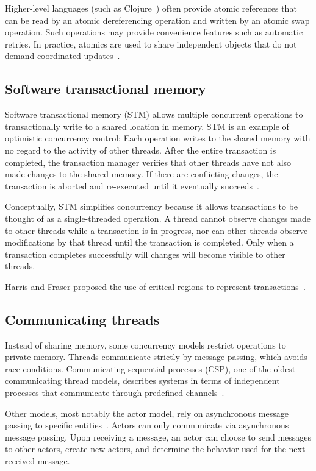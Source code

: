 \documentclass{sig-alternate}
\begin{document}
Higher-level languages (such as Clojure~\cite{Swalens2014}) often provide atomic references that can be read by an atomic dereferencing operation and written by an atomic swap operation. Such operations may provide convenience features such as automatic retries. In practice, atomics are used to share independent objects that do not demand coordinated updates~\cite{Swalens2014}.

\subsection{Software transactional memory}

Software transactional memory (STM) allows multiple concurrent operations to transactionally write to a shared location in memory. STM is an example of optimistic concurrency control: Each operation writes to the shared memory with no regard to the activity of other threads. After the entire transaction is completed, the transaction manager verifies that other threads have not also made changes to the shared memory. If there are conflicting changes, the transaction is aborted and re-executed until it eventually succeeds~\cite{Shavit1995}.

Conceptually, STM simplifies concurrency because it allows transactions to be thought of as a single-threaded operation. A thread cannot observe changes made to other threads while a transaction is in progress, nor can other threads observe modifications by that thread until the transaction is completed. Only when a transaction completes successfully will changes will become visible to other threads.

Harris and Fraser proposed the use of critical regions to represent transactions~\cite{Harris2014}.

\subsection{Communicating threads}

Instead of sharing memory, some concurrency models restrict operations to private memory. Threads communicate strictly by message passing, which avoids race conditions. Communicating sequential processes (CSP), one of the oldest communicating thread models, describes systems in terms of independent processes that communicate through predefined channels~\cite{Hoare1978}.

Other models, most notably the actor model, rely on asynchronous message passing to specific entities~\cite{Agha1986}. Actors can only communicate via asynchronous message passing. Upon receiving a message, an actor can choose to send messages to other actors, create new actors, and determine the behavior used for the next received message.
\end{document}
